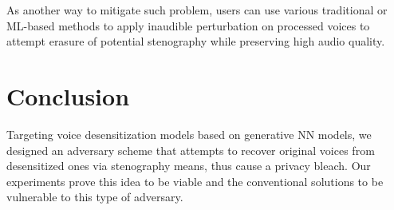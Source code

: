 \documentclass[journal]{IEEEtran} %
\begin{document}
As another way to mitigate such problem, users can use various traditional or ML-based methods to apply inaudible perturbation on processed voices to attempt erasure of potential stenography while preserving high audio quality.

\section{Conclusion}

Targeting voice desensitization models based on generative NN models, we designed an adversary scheme that attempts to recover original voices from desensitized ones via stenography means, thus cause a privacy bleach. Our experiments prove this idea to be viable and the conventional solutions to be vulnerable to this type of adversary.
\end{document}
